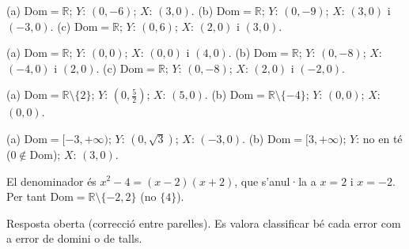 \begin{solucions}
\begin{sollist}
  \item (a) $\mathrm{Dom}=\mathbb{R}$; $Y$: $(0,-6)$; $X$: $(3,0)$. \quad
        (b) $\mathrm{Dom}=\mathbb{R}$; $Y$: $(0,-9)$; $X$: $(3,0)$ i $(-3,0)$. \quad
        (c) $\mathrm{Dom}=\mathbb{R}$; $Y$: $(0,6)$; $X$: $(2,0)$ i $(3,0)$.
  \item (a) $\mathrm{Dom}=\mathbb{R}$; $Y$: $(0,0)$; $X$: $(0,0)$ i $(4,0)$. \quad
        (b) $\mathrm{Dom}=\mathbb{R}$; $Y$: $(0,-8)$; $X$: $(-4,0)$ i $(2,0)$. \quad
        (c) $\mathrm{Dom}=\mathbb{R}$; $Y$: $(0,-8)$; $X$: $(2,0)$ i $(-2,0)$.
  \item (a) $\mathrm{Dom}=\mathbb{R}\setminus\{2\}$; $Y$: $\left(0,\tfrac{5}{2}\right)$;
        $X$: $(5,0)$. \quad
        (b) $\mathrm{Dom}=\mathbb{R}\setminus\{-4\}$; $Y$: $(0,0)$; $X$: $(0,0)$.
  \item (a) $\mathrm{Dom}=[-3,+\infty)$; $Y$: $(0,\sqrt{3})$; $X$: $(-3,0)$. \quad
        (b) $\mathrm{Dom}=[3,+\infty)$; $Y$: no en té ($0\notin\mathrm{Dom}$);
        $X$: $(3,0)$.
  \item El denominador és $x^2-4=(x-2)(x+2)$, que s'anul·la a $x=2$ i $x=-2$. Per
        tant $\mathrm{Dom}=\mathbb{R}\setminus\{-2,2\}$ (no $\{4\}$).
  \item Resposta oberta (correcció entre parelles). Es valora classificar bé cada
        error com a error de domini o de talls.
\end{sollist}
\end{solucions}
